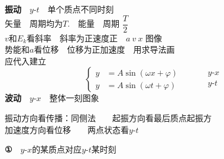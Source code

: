 \textbf{振动}　$y$-$t$　单个质点不同时刻\\
\hspace*{1em}矢量　周期均为$T$.　能量　周期 $\dfrac{T}{2}$\\
\hspace*{1em}$v$和$E_k$看斜率　斜率为正速度正　$a\ v\ x$ 图像\\
\hspace*{1em}势能和$a$看位移　位移为正加速度　用求导法画\\
\hspace*{1em}应代入建立
\[
\left\{\begin{aligned}
y&=A\sin(\omega x+\varphi)\\
y&=A\sin(\omega t+\varphi)
\end{aligned}\right.
\qquad
\begin{aligned}
&y\text{-}x\\
&y\text{-}t
\end{aligned}
\]
\textbf{波动}　$y$-$x$　整体一刻图象

\hspace*{1em}振动方向看传播：同侧法　　起振方向看最后质点起振方\\
\hspace*{1em}加速度方向看位移　　两点状态看$y$-$t$

\medskip
\textbf{①}　$y$-$x$的某质点对应$y$-$t$某时刻


